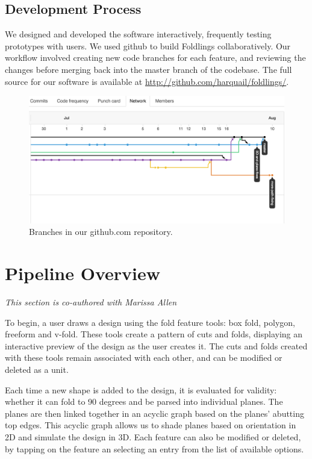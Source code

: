\subsection{Development Process}\label{development-process}

We designed and developed the software interactively, frequently testing
prototypes with users. We used github to build Foldlings
collaboratively. Our workflow involved creating new code branches for
each feature, and reviewing the changes before merging back into the
master branch of the codebase. The full source for our software is
available at \url{http://github.com/harquail/foldlings/}.

\begin{figure}[htbp]
\centering
\includegraphics{figures/30_UI_Design_Philosophy/gitflow.png}
\caption{Branches in our github.com repository.}
\end{figure}

\section{Pipeline Overview}\label{pipeline-overview}

\emph{This section is co-authored with Marissa Allen}

To begin, a user draws a design using the fold feature tools: box fold,
polygon, freeform and v-fold. These tools create a pattern of cuts and
folds, displaying an interactive preview of the design as the user
creates it. The cuts and folds created with these tools remain
associated with each other, and can be modified or deleted as a unit.

Each time a new shape is added to the design, it is evaluated for
validity: whether it can fold to 90 degrees and be parsed into
individual planes. The planes are then linked together in an acyclic
graph based on the planes' abutting top edges. This acyclic graph allows
us to shade planes based on orientation in 2D and simulate the design in
3D. Each feature can also be modified or deleted, by tapping on the
feature an selecting an entry from the list of available options.

